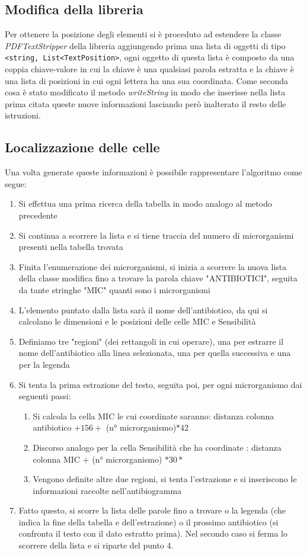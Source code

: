\subsection{Modifica della libreria}
Per ottenere la posizione degli elementi si è proceduto ad estendere la classe \textit{PDFTextStripper} della libreria aggiungendo prima una lista di oggetti di tipo \texttt{<string, List<TextPosition>}, ogni oggetto di questa lista è composto da una coppia chiave-valore in cui la chiave è una qualsiasi parola estratta e la chiave è una lista di posizioni in cui ogni lettera ha una sua coordinata.
Come seconda cosa è stato modificato il metodo \textit{writeString} in modo che inserisse nella lista prima citata queste nuove informazioni lasciando però inalterato il resto delle istruzioni.
\newline
\subsection{Localizzazione delle celle}
Una volta generate queste informazioni è possibile rappresentare l'algoritmo come segue:
\begin{enumerate}
	\item Si effettua una prima ricerca della tabella in modo analogo al metodo precedente
	\item Si continua a scorrere la lista e si tiene traccia del numero di microrganismi presenti nella tabella trovata
	\item Finita l'enumerazione dei microrganismi, si inizia a scorrere la nuova lista della classe modifica fino a trovare la parola chiave "ANTIBIOTICI", seguita da tante stringhe "MIC" quanti sono i microrganismi
	\item L'elemento puntato dalla lista sarà il nome dell'antibiotico, da qui si calcolano le dimensioni e le posizioni delle celle MIC e Sensibilità
	\item Definiamo tre "regioni" (dei rettangoli in cui operare), una per estrarre il nome dell'antibiotico alla linea selezionata, una per quella successiva e una per la legenda
	\item Si tenta la prima estrazione del testo, seguita poi, per ogni microrganismo dai seguenti passi:
	\begin{enumerate}
		\item Si calcola la cella MIC le cui coordinate saranno: distanza colonna antibiotico $ + 156 + $ (n° microrganismo)$*42$
		\item Discorso analogo per la cella Sensibilità che ha coordinate : distanza colonna MIC $ + $ (n° microrganismo) $*30*$
		\item Vengono definite altre due regioni, si tenta l'estrazione e si inseriscono le informazioni raccolte nell'antibiogramma
		\end{enumerate}
		\item Fatto questo, si scorre la lista delle parole fino a trovare o la legenda (che indica la fine della tabella e dell'estrazione) o il prossimo antibiotico (si confronta il testo con il dato estratto prima). Nel secondo caso si ferma lo scorrere della lista e si riparte del punto 4.
		\end{enumerate}
